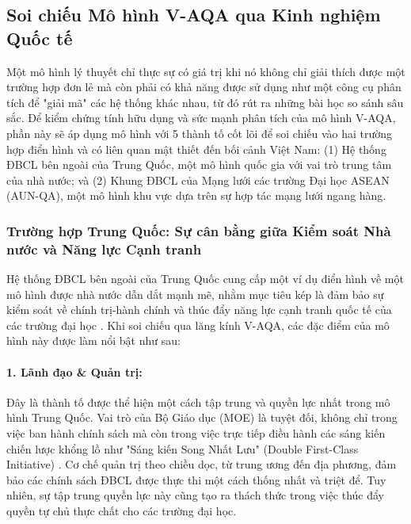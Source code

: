 \documentclass[12pt, a4paper, openany]{report}
\begin{document}
\subsection{Soi chiếu Mô hình V-AQA qua Kinh nghiệm Quốc tế}
\label{subsec:soi_chieu_quoc_te}
Một mô hình lý thuyết chỉ thực sự có giá trị khi nó không chỉ giải thích được một trường hợp đơn lẻ mà còn phải có khả năng được sử dụng như một công cụ phân tích để "giải mã" các hệ thống khác nhau, từ đó rút ra những bài học so sánh sâu sắc. Để kiểm chứng tính hữu dụng và sức mạnh phân tích của mô hình V-AQA, phần này sẽ áp dụng mô hình với 5 thành tố cốt lõi để soi chiếu vào hai trường hợp điển hình và có liên quan mật thiết đến bối cảnh Việt Nam: (1) Hệ thống ĐBCL bên ngoài của Trung Quốc, một mô hình quốc gia với vai trò trung tâm của nhà nước; và (2) Khung ĐBCL của Mạng lưới các trường Đại học ASEAN (AUN-QA), một mô hình khu vực dựa trên sự hợp tác mạng lưới ngang hàng.

\subsubsection{Trường hợp Trung Quốc: Sự cân bằng giữa Kiểm soát Nhà nước và Năng lực Cạnh tranh}
\label{subsubsec:case_china}
Hệ thống ĐBCL bên ngoài của Trung Quốc cung cấp một ví dụ điển hình về một mô hình được nhà nước dẫn dắt mạnh mẽ, nhằm mục tiêu kép là đảm bảo sự kiểm soát về chính trị-hành chính và thúc đẩy năng lực cạnh tranh quốc tế của các trường đại học \cite{ChinaEQA_Overview}. Khi soi chiếu qua lăng kính V-AQA, các đặc điểm của mô hình này được làm nổi bật như sau:

\paragraph{1. Lãnh đạo \& Quản trị:} Đây là thành tố được thể hiện một cách tập trung và quyền lực nhất trong mô hình Trung Quốc. Vai trò của Bộ Giáo dục (MOE) là tuyệt đối, không chỉ trong việc ban hành chính sách mà còn trong việc trực tiếp điều hành các sáng kiến chiến lược khổng lồ như "Sáng kiến Song Nhất Lưu" (Double First-Class Initiative) \cite{ChinaEQA_Reforms2015}. Cơ chế quản trị theo chiều dọc, từ trung ương đến địa phương, đảm bảo các chính sách ĐBCL được thực thi một cách thống nhất và triệt để. Tuy nhiên, sự tập trung quyền lực này cũng tạo ra thách thức trong việc thúc đẩy quyền tự chủ thực chất cho các trường đại học.
\end{document}
